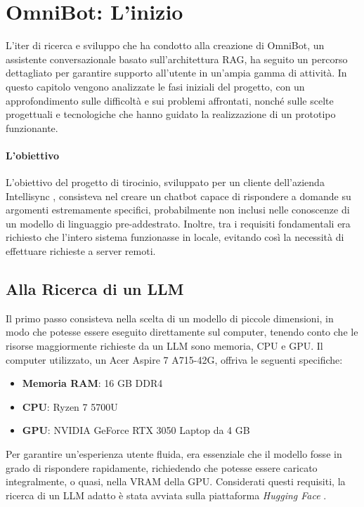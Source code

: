 \chapter{OmniBot: L'inizio}
\label{cap:omnibot1}
L'iter di ricerca e sviluppo che ha condotto alla creazione di OmniBot, un assistente conversazionale basato sull'architettura RAG, ha seguito un percorso dettagliato per garantire supporto all'utente in un'ampia gamma di attività. In questo capitolo vengono analizzate le fasi iniziali del progetto, con un approfondimento sulle difficoltà e sui problemi affrontati, nonché sulle scelte progettuali e tecnologiche che hanno guidato la realizzazione di un prototipo funzionante.

\subsubsection{L'obiettivo}
L'obiettivo del progetto di tirocinio, sviluppato per un cliente dell'azienda Intellisync \cite{intellisync}, consisteva nel creare un chatbot capace di rispondere a domande su argomenti estremamente specifici, probabilmente non inclusi nelle conoscenze di un modello di linguaggio pre-addestrato. Inoltre, tra i requisiti fondamentali era richiesto che l'intero sistema funzionasse in locale, evitando così la necessità di effettuare richieste a server remoti.

\section{Alla Ricerca di un LLM}
\label{sec:ricercallm}
Il primo passo consisteva nella scelta di un modello di piccole dimensioni, in modo che potesse essere eseguito direttamente sul computer, tenendo conto che le risorse maggiormente richieste da un LLM sono memoria, CPU e GPU. Il computer utilizzato, un Acer Aspire 7 A715-42G, offriva le seguenti specifiche:
\begin{itemize}
    \item \textbf{Memoria RAM}: 16 GB DDR4
    \item \textbf{CPU}: Ryzen 7 5700U
    \item \textbf{GPU}: NVIDIA GeForce RTX 3050 Laptop da 4 GB
\end{itemize}
Per garantire un'esperienza utente fluida, era essenziale che il modello fosse in grado di rispondere rapidamente, richiedendo che potesse essere caricato integralmente, o quasi, nella VRAM della GPU. Considerati questi requisiti, la ricerca di un LLM adatto è stata avviata sulla piattaforma \textit{Hugging Face} \cite{huggingfacehomepage}.

